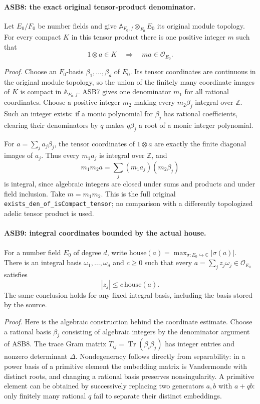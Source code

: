 \paragraph{ASB8: the exact original tensor-product denominator.}
\label{claim:ASB8}
Let \(E_0/F_0\) be number fields and give
\(\mathbb A_{F_0,f}\otimes_{F_0}E_0\) its original module topology.
For every compact \(K\) in this tensor product there is one
positive integer \(m\) such that
\[
                 1\otimes a\in K\quad\Longrightarrow\quad
                       ma\in\mathcal O_{E_0}.
 \tag{ASB.21}
\]

\emph{Proof.}
Choose an \(F_0\)-basis \(\beta_1,\ldots,\beta_d\) of \(E_0\).
Its tensor coordinates are continuous in the original module
topology, so the union of the finitely many coordinate images of
\(K\) is compact in \(\mathbb A_{F_0,f}\).
ASB7 gives one denominator \(m_1\) for all rational coordinates.
Choose a positive integer \(m_2\) making every \(m_2\beta_j\)
integral over \(\mathbb Z\).
Such an integer exists: if a monic polynomial for \(\beta_j\)
has rational coefficients, clearing their denominators by \(q\)
makes \(q\beta_j\) a root of a monic integer polynomial.

For \(a=\sum_j a_j\beta_j\), the tensor coordinates of
\(1\otimes a\) are exactly the finite diagonal images of \(a_j\).
Thus every \(m_1a_j\) is integral over \(\mathbb Z\), and
\[
                 m_1m_2a=\sum_j(m_1a_j)(m_2\beta_j)
 \tag{ASB.22}
\]
is integral, since algebraic integers are closed under sums
and products and under field inclusion.
Take \(m=m_1m_2\).
This is the full original
\texttt{exists\_den\_of\_isCompact\_tensor}; no comparison with
a differently topologized adelic tensor product is used.

\paragraph{ASB9: integral coordinates bounded by the actual house.}
\label{claim:ASB9}
For a number field \(E_0\) of degree \(d\), write
\(\mathrm{house}(a)=\max_{\sigma:E_0\hookrightarrow\mathbb C}
|\sigma(a)|\).
There is an integral basis \(\omega_1,\ldots,\omega_d\) and
\(c\ge0\) such that every
\(a=\sum_jz_j\omega_j\in\mathcal O_{E_0}\) satisfies
\[
                         |z_j|\le c\,\mathrm{house}(a).
 \tag{ASB.23}
\]
The same conclusion holds for any fixed integral basis, including
the basis stored by the source.

\emph{Proof.}
Here is the algebraic construction behind the coordinate estimate.
Choose a rational basis \(\beta_j\) consisting of algebraic integers
by the denominator argument of ASB8.
The trace Gram matrix \(T_{ij}=\operatorname{Tr}(\beta_i\beta_j)\)
has integer entries and nonzero determinant \(\Delta\).
Nondegeneracy follows directly from separability: in a power basis
of a primitive element the embedding matrix is Vandermonde with
distinct roots, and changing a rational basis preserves
nonsingularity.  A primitive element can be obtained by successively
replacing two generators \(a,b\) with \(a+qb\): only finitely many
rational \(q\) fail to separate their distinct embeddings.

